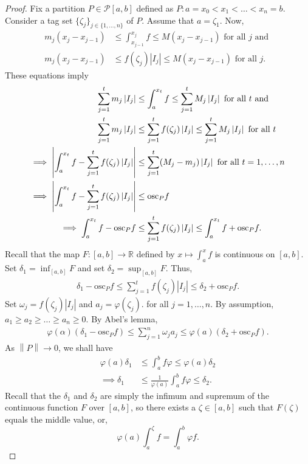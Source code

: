 \documentclass[15pt,a4paper]{book}
\theoremstyle{definition}
\newcommand{\abs}[1]{\left| #1 \right|} %
\newcommand{\R}{\mathbb{R}} %
\newcommand{\cP}{\mathcal{P}}
\newcommand{\osc}{\text{osc}}
\newcommand{\norm}[1]{\left\lVert#1\right\rVert}
\begin{document}
\begin{proof}
    Fix a partition $P \in \cP[a,b]$ defined as $P:a=x_{0} < x_{1} < \ldots < x_{n} = b$. Consider a tag set $\{\zeta_{j}\}_{j \in \{1,\ldots,n\}}$ of $P$. Assume that $a = \zeta_{1}$. Now,
    \begin{align}
        m_{j}(x_{j}-x_{j-1}) &\leq \int_{x_{j-1}}^{x_{j}} f \leq M(x_{j}-x_{j-1}) \text{ for all } j \text{ and } \\
        m_{j}(x_{j}-x_{j-1}) &\leq f(\zeta_{j}) \abs{I_{j}} \leq M(x_{j}-x_{j-1}) \text{ for all } j.
    \end{align}
    These equations imply
    \begin{align}
        \sum_{j=1}^{t} m_{j}\abs{I_{j}} &\leq \int_{a}^{x_{t}} f \leq \sum_{j=1}^{t} M_{j}\abs{I_{j}} \text{ for all } t \text{ and }\\
        \sum_{j=1}^{t} m_{j}\abs{I_{j}} &\leq \sum_{j=1}^{t} f(\zeta_{j}) \abs{I_{j}} \leq \sum_{j=1}^{t} M_{j} \abs{I_{j}} \text{ for all } t \\
        \implies \abs{\int_{a}^{x_{t}} f - \sum_{j=1}^{t} f(\zeta_{j}) \abs{I_{j}}} &\leq \sum_{j=1}^{t} (M_{j}-m_{j}) \abs{I_{j}} \text{ for all } t = 1,\ldots,n \notag \\
        \implies \abs{\int_{a}^{x_{t}} f - \sum_{j=1}^{t} f(\zeta_{j})\abs{I_{j}}} &\leq \osc_{P} f \\
        \implies \int_{a}^{x_{t}} f - \osc_{P}f &\leq \sum_{j=1}^{t} f(\zeta_{j}) \abs{I_{j}} \leq \int_{a}^{x_{t}} f + \osc_{P}f.
    \end{align}
    Recall that the map $F:[a,b] \to \R$ defined by $x \mapsto \int_{a}^{x} f$ is continuous on $[a,b]$. Set $\delta_{1} = \inf_{[a,b]} F$ and set $\delta_{2} = \sup_{[a,b]} F$. Thus,
    \begin{align}
        \delta_{1} - \osc_{P}f \leq \sum_{j=1}^{t} f(\zeta_{j})\abs{I_{j}} \leq \delta_{2} + \osc_{P}f.
    \end{align}
    Set $\omega_{j} = f(\zeta_{j}) \abs{I_{j}}$ and $a_{j} = \varphi(\zeta_{j})$. for all $j = 1,\ldots,n$. By assumption, $a_{1} \geq a_{2} \geq \ldots \geq a_{n} \geq 0$. By Abel's lemma,
    \begin{align}
        \varphi(\alpha)(\delta_{1}-\osc_{P}f) \leq \sum_{j=1}^{n} \omega_{j} a_{j} \leq \varphi(a)(\delta_{2} + \osc_{P}f).
    \end{align}
    As $\norm{P} \to 0$, we shall have
    \begin{align}
        \varphi(a)\delta_{1} &\leq \int_{a}^{b} f \varphi \leq \varphi(a) \delta_{2} \\
        \implies \delta_{1} &\leq \frac{1}{\varphi(a)} \int_{a}^{b} f\varphi \leq \delta_{2}.
    \end{align}
    Recall that the $\delta_{1}$ and $\delta_{2}$ are simply the infimum and supremum of the continuous function $F$ over $[a,b]$, so there exists a $\zeta \in [a,b]$ such that $F(\zeta)$ equals the middle value, or,
    \begin{equation}
        \varphi(a) \int_{a}^{\zeta} f = \int_{a}^{b} \varphi f.
    \end{equation}
\end{proof}
\end{document}
